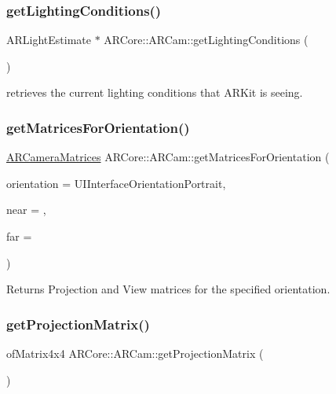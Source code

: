 \subsubsection{\texorpdfstring{get\+Lighting\+Conditions()}{getLightingConditions()}}
{\footnotesize\ttfamily A\+R\+Light\+Estimate $\ast$ A\+R\+Core\+::\+A\+R\+Cam\+::get\+Lighting\+Conditions (\begin{DoxyParamCaption}{ }\end{DoxyParamCaption})}



retrieves the current lighting conditions that A\+R\+Kit is seeing. 

\mbox{\label{class_a_r_core_1_1_a_r_cam_a0061e3c56e3d30e6fec64235d9397809}} 
\subsubsection{\texorpdfstring{get\+Matrices\+For\+Orientation()}{getMatricesForOrientation()}}
{\footnotesize\ttfamily \hyperlink{struct_a_r_common_1_1_a_r_camera_matrices}{A\+R\+Camera\+Matrices} A\+R\+Core\+::\+A\+R\+Cam\+::get\+Matrices\+For\+Orientation (\begin{DoxyParamCaption}\item[{U\+I\+Interface\+Orientation}]{orientation = {\ttfamily UIInterfaceOrientationPortrait},  }\item[{float}]{near = {},  }\item[{float}]{far = {} }\end{DoxyParamCaption})}



Returns Projection and View matrices for the specified orientation. 

\mbox{\label{class_a_r_core_1_1_a_r_cam_a19409c89b0bcbaad62e5d405d194f8a7}} 
\subsubsection{\texorpdfstring{get\+Projection\+Matrix()}{getProjectionMatrix()}}
{\footnotesize\ttfamily of\+Matrix4x4 A\+R\+Core\+::\+A\+R\+Cam\+::get\+Projection\+Matrix (\begin{DoxyParamCaption}{ }\end{DoxyParamCaption})\hspace{0.3cm}{\ttfamily [inline]}}



